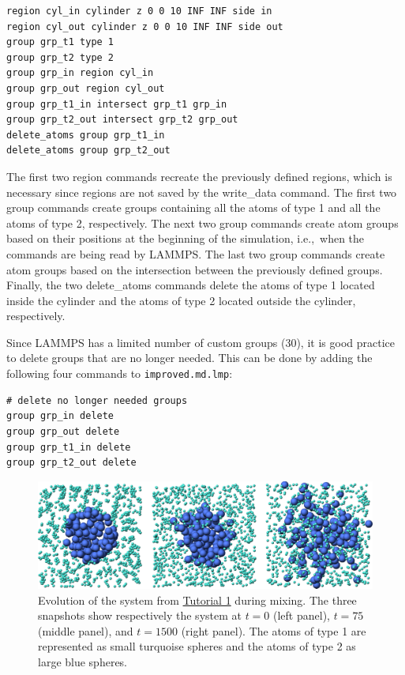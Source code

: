 \documentclass[9pt,tutorial]{livecoms}
\newcommand{\lmpcmd}[1]{\hspace{0pt}\colorbox{listing}{\textcolor{command}{\small{#1}}}\hspace{0pt}} %
\newcommand{\flecmd}[1]{\textcolor{command}{\texttt{#1}}} %
\begin{document}
\begin{lstlisting}
region cyl_in cylinder z 0 0 10 INF INF side in
region cyl_out cylinder z 0 0 10 INF INF side out
group grp_t1 type 1
group grp_t2 type 2
group grp_in region cyl_in
group grp_out region cyl_out
group grp_t1_in intersect grp_t1 grp_in
group grp_t2_out intersect grp_t2 grp_out
delete_atoms group grp_t1_in
delete_atoms group grp_t2_out
\end{lstlisting}
The first two \lmpcmd{region} commands recreate the previously defined
regions, which is necessary since regions are not saved by the
\lmpcmd{write\_data} command.  The first two \lmpcmd{group} commands
create groups containing all the atoms of type 1 and all the
atoms of type 2, respectively.  The next two \lmpcmd{group} commands
create atom groups based on their positions at the beginning of the
simulation, i.e.,~when the commands are being read by LAMMPS.  The last
two \lmpcmd{group} commands create atom groups based on the intersection
between the previously defined groups.  Finally, the two
\lmpcmd{delete\_atoms} commands delete the atoms of type 1
located inside the cylinder and the atoms of type 2 located
outside the cylinder, respectively.

Since LAMMPS has a limited number of custom groups (30), it is good practice
to delete groups that are no longer needed.  This can be done by adding the
following four commands to \flecmd{improved.md.lmp}:
\begin{lstlisting}
# delete no longer needed groups
group grp_in delete
group grp_out delete
group grp_t1_in delete
group grp_t2_out delete
\end{lstlisting}

\begin{figure}
\centering
\includegraphics[width=\linewidth]{LJ-evolution}
\caption{Evolution of the system from \hyperref[lennard-jones-label]{Tutorial 1}
during mixing.  The three snapshots show respectively the system
at $t=0$ (left panel), $t=75$ (middle panel), and $t=1500$ (right panel).  The
atoms of type 1 are represented as small turquoise spheres and the atoms of type 2
as large blue spheres.}
\label{fig:evolution-population}
\end{figure}
\end{document}
